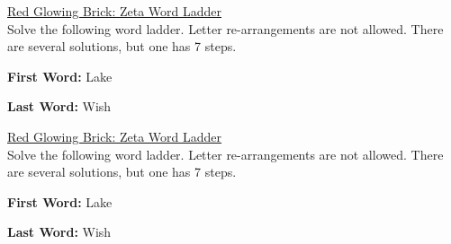 \documentclass[white]{GL2020}
\begin{document}
\name{\wWordLadderZeta{}}

\vspace*{0.5cm}
\begin{center}
{\LARGE \underline{Red Glowing Brick: Zeta Word Ladder}}\\
\vspace{0.5cm}
Solve the following word ladder. Letter re-arrangements are not allowed. There are several solutions, but one has 7 steps.

\textbf{First Word:} Lake

\vspace{6cm}

\textbf{Last Word:} Wish

\vfill
{\LARGE \underline{Red Glowing Brick: Zeta Word Ladder}}\\
\vspace{0.5cm}
Solve the following word ladder. Letter re-arrangements are not allowed. There are several solutions, but one has 7 steps.

\textbf{First Word:} Lake

\vspace{6cm}

\textbf{Last Word:} Wish

\end{center}
\end{document}
